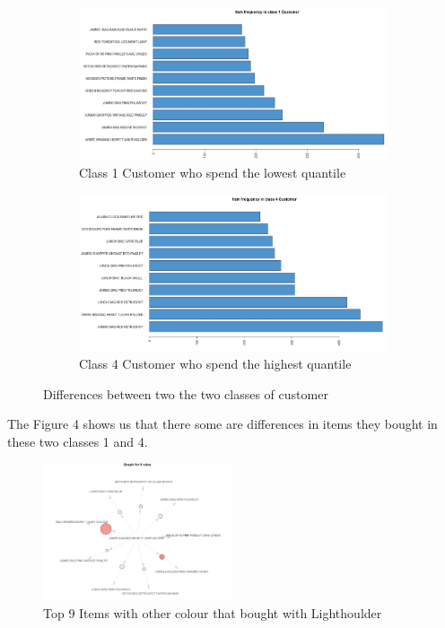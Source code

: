 \documentclass[11pt]{article}
\begin{document}
\begin{figure}[!htp]        
  \centering
\begin{subfigure}{.63\textwidth}
  \centering
  \includegraphics[width=.8\linewidth]{pics/freq1.jpg}
  \caption{Class 1 Customer who spend the lowest quantile}
  \label{fig:sub1}
\end{subfigure}%
\begin{subfigure}{.63\textwidth}
  \centering
  \includegraphics[width=.7\linewidth]{pics/freq4.jpg}
  \caption{Class 4 Customer who spend the highest quantile}
  \label{fig:sub2}
\end{subfigure}
\caption{Differences between two the two classes of customer}
\end{figure}

The Figure 4 shows us that there some are differences in items they bought in these two classes 1 and 4.


\begin{figure}[!htp]        
  \centering
    \includegraphics[width=0.5\textwidth]{pics/top9color.jpg}
    \caption{Top 9 Items with other colour that bought with Lighthoulder}
\end{figure}
\end{document}
